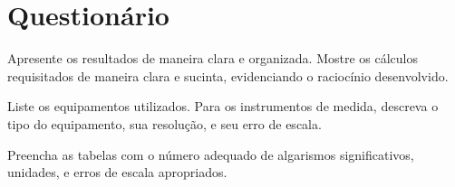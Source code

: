 
\vspace{15mm}

\begin{fullwidth}
\noindent{}
\vspace{5mm}

\noindent{}

\noindent{}

\noindent{}

\noindent{}

\noindent{}
\end{fullwidth}

\vspace{5mm}

\section{Questionário}

\begin{question}[type={exam}]{1}
Apresente os resultados de maneira clara e organizada. Mostre os cálculos requisitados de maneira clara e sucinta, evidenciando o raciocínio desenvolvido.
\end{question}

\begin{question}[type={exam}]{1}
Liste os equipamentos utilizados. Para os instrumentos de medida, descreva o tipo do equipamento, sua resolução, e seu erro de escala.
\end{question}

\begin{question}[type={exam}]{1.5}
Preencha as tabelas com o número adequado de algarismos significativos, unidades, e erros de escala apropriados. 
\end{question}

